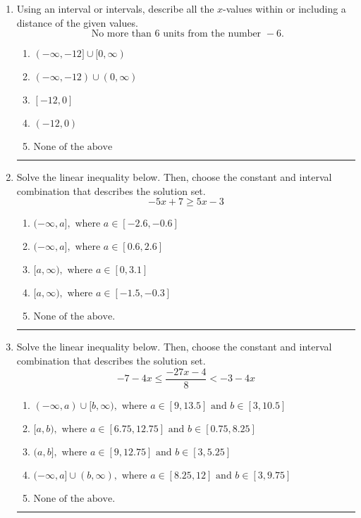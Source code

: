 \documentclass[14pt]{extbook}
\newcommand{\litem}[1]{\item#1\hspace*{-1cm}\rule{\textwidth}{0.4pt}}
\begin{document}
\begin{enumerate}
\litem{
Using an interval or intervals, describe all the $x$-values within or including a distance of the given values.\[ \text{ No more than } 6 \text{ units from the number } -6. \]\begin{enumerate}[label=\Alph*.]
\item \( (-\infty, -12] \cup [0, \infty) \)
\item \( (-\infty, -12) \cup (0, \infty) \)
\item \( [-12, 0] \)
\item \( (-12, 0) \)
\item \( \text{None of the above} \)

\end{enumerate} }
\litem{
Solve the linear inequality below. Then, choose the constant and interval combination that describes the solution set.\[ -5x + 7 \geq 5x -3 \]\begin{enumerate}[label=\Alph*.]
\item \( (-\infty, a], \text{ where } a \in [-2.6, -0.6] \)
\item \( (-\infty, a], \text{ where } a \in [0.6, 2.6] \)
\item \( [a, \infty), \text{ where } a \in [0, 3.1] \)
\item \( [a, \infty), \text{ where } a \in [-1.5, -0.3] \)
\item \( \text{None of the above}. \)

\end{enumerate} }
\litem{
Solve the linear inequality below. Then, choose the constant and interval combination that describes the solution set.\[ -7 - 4 x \leq \frac{-27 x - 4}{8} < -3 - 4 x \]\begin{enumerate}[label=\Alph*.]
\item \( (-\infty, a) \cup [b, \infty), \text{ where } a \in [9, 13.5] \text{ and } b \in [3, 10.5] \)
\item \( [a, b), \text{ where } a \in [6.75, 12.75] \text{ and } b \in [0.75, 8.25] \)
\item \( (a, b], \text{ where } a \in [9, 12.75] \text{ and } b \in [3, 5.25] \)
\item \( (-\infty, a] \cup (b, \infty), \text{ where } a \in [8.25, 12] \text{ and } b \in [3, 9.75] \)
\item \( \text{None of the above.} \)


\end{enumerate}}
\end{enumerate}
\end{document}
